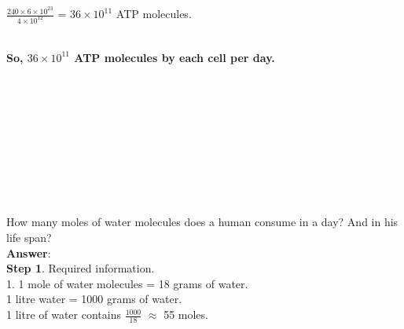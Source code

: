 \documentclass[11pt]{exam}
\begin{document}
\begin{questions}
{\begin{minipage}{38em}
$\frac{240\times6\times10^{23}} {4\times10^12}$ = $36\times 10^{11}$ ATP molecules.\\  

\end{minipage}} \\

\textbf{So, $36\times 10^{11}$ ATP molecules by each cell per day. } \\ \\ \\ \\ \\ \\ \\ \\ \\ \\


\question
\label{Q11:Moles of water molecules}

How many moles of water molecules does a human consume in a day? And in his life span? \\
\textbf{Answer}: \\
\textbf{Step 1}. Required information. \\

1. 1 mole of water molecules = 18 grams of water. \\
                           1 litre water = 1000 grams of water. \\
1 litre of water contains $\frac{1000}{18}$ $\approx$ 55 moles. \\ 

 \\ 


\end{questions}
\end{document}
